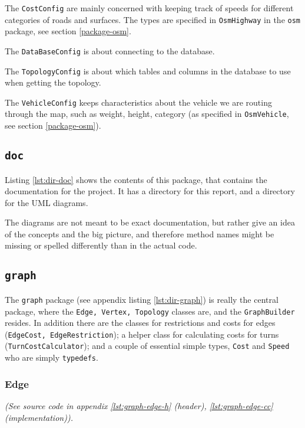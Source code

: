 \documentclass[../main.tex]{subfiles}
\begin{document}
The \texttt{CostConfig} are mainly concerned with keeping track of speeds for different categories of roads and surfaces. The types are specified in \texttt{OsmHighway} in the \texttt{osm} package, see section \ref{package-osm}.

The \texttt{DataBaseConfig} is about connecting to the database.

The \texttt{TopologyConfig} is about which tables and columns in the database to use when getting the topology.

The \texttt{VehicleConfig} keeps characteristics about the vehicle we are routing through the map, such as weight, height, category (as specified in \texttt{OsmVehicle}, see section \ref{package-osm}).

\subsection{\texttt{doc}}
Listing \ref{lst:dir-doc} shows the contents of this package, that contains the documentation for the project. It has a directory for this report, and a directory for the UML diagrams.

The diagrams are not meant to be exact documentation, but rather give an idea of the concepts and the big picture, and therefore method names might be missing or spelled differently than in the actual code.

\subsection{\texttt{graph}}
The \texttt{graph} package (see appendix listing \ref{lst:dir-graph}) is really the central package, where the \texttt{Edge, Vertex, Topology} classes are, and the \texttt{GraphBuilder} resides. In addition there are the classes for restrictions and costs for edges (\texttt{EdgeCost, EdgeRestriction}); a helper class for calculating costs for turns (\texttt{TurnCostCalculator}); and a couple of essential simple types, \texttt{Cost} and \texttt{Speed} who are simply \texttt{typedefs}.

\subsubsection{Edge}
\textit{(See source code in appendix \ref{lst:graph-edge-h} (header), \ref{lst:graph-edge-cc} (implementation)).}
\end{document}
